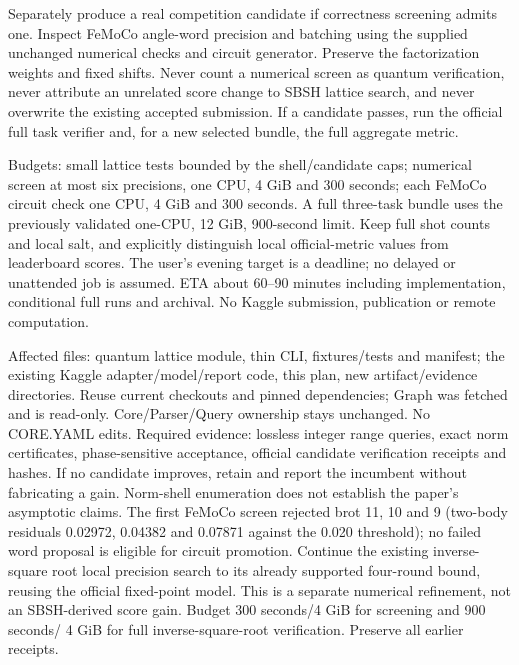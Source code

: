\documentclass{article}
\begin{document}
Separately produce a real competition candidate if correctness screening admits
one. Inspect FeMoCo angle-word precision and batching using the supplied unchanged
numerical checks and circuit generator. Preserve the factorization weights and
fixed shifts. Never count a numerical screen as quantum verification, never
attribute an unrelated score change to SBSH lattice search, and never overwrite
the existing accepted submission. If a candidate passes, run the official full
task verifier and, for a new selected bundle, the full aggregate metric.

Budgets: small lattice tests bounded by the shell/candidate caps; numerical
screen at most six precisions, one CPU, 4 GiB and 300 seconds; each FeMoCo circuit
check one CPU, 4 GiB and 300 seconds. A full three-task bundle uses the previously
validated one-CPU, 12 GiB, 900-second limit. Keep full shot counts and local salt,
and explicitly distinguish local official-metric values from leaderboard scores.
The user's evening target is a deadline; no delayed or unattended job is assumed.
ETA about 60--90 minutes including implementation, conditional full runs and
archival. No Kaggle submission, publication or remote computation.

Affected files: quantum lattice module, thin CLI, fixtures/tests and manifest;
the existing Kaggle adapter/model/report code, this plan, new artifact/evidence
directories. Reuse current checkouts and pinned dependencies; Graph was fetched
and is read-only. Core/Parser/Query ownership stays unchanged. No CORE.YAML edits.
Required evidence: lossless integer range queries, exact norm certificates,
phase-sensitive acceptance, official candidate verification receipts and hashes.
If no candidate improves, retain and report the incumbent without fabricating a
gain. Norm-shell enumeration does not establish the paper's asymptotic claims.
The first FeMoCo screen rejected brot 11, 10 and 9 (two-body residuals
0.02972, 0.04382 and 0.07871 against the 0.020 threshold); no failed word
proposal is eligible for circuit promotion. Continue the existing inverse-square
root local precision search to its already supported four-round bound, reusing
the official fixed-point model. This is a separate numerical refinement, not an
SBSH-derived score gain. Budget 300 seconds/4 GiB for screening and 900 seconds/
4 GiB for full inverse-square-root verification. Preserve all earlier receipts.
\end{document}
